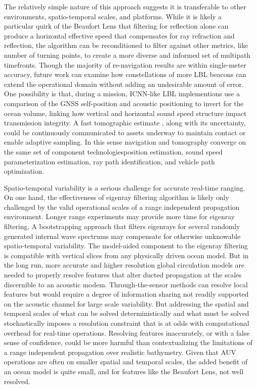 The relatively simple nature of this approach suggests it is transferable to other environments, spatio-temporal scales, and platforms.
While it is likely a particular quirk of the Beaufort Lens that filtering for reflection alone can produce a horizontal effective speed that compensates for ray refraction and reflection, the algorithm can be reconditioned to filter against other metrics, like number of turning points, to create a more diverse and informed set of multipath timefronts.
Though the majority of re-navigation results are within single-meter accuracy, future work can examine how constellations of more LBL beacons can extend the operational domain without adding an undesirable amount of error.
One possibility is that, during a mission, ICNN-like LBL implementions use a comparison of the GNSS self-position and acoustic positioning to invert for the ocean volume, linking how vertical and horizontal sound speed structure impact transmission integrity.
 A fast tomographic estimate \citep{deffenbaugh_optimal_1997,Elisseeff2002}, along with its uncertainty, could be continuously communicated to assets underway to maintain contact or enable adaptive sampling.
In this sense navigation and tomography converge on the same set of component technologies\textemdash position estimation, sound speed parameterization estimation, ray path identification, and vehicle path optimization.

Spatio-temporal variability is a serious challenge for accurate real-time ranging.
On one hand, the effectiveness of eigenray filtering algorithm is likely only challenged by the valid operational scales of a range independent propagation environment.
Longer range experiments may provide more time for eigenray filtering.
A bootstrapping approach that filters eigenrays for several randomly generated internal wave spectrums may compensate for otherwise unknowable spatio-temporal variability.
The model-aided component to the eigenray filtering is compatible with vertical slices from any physically driven ocean model.
But in the long run, more accurate and higher resolution global circulation models are needed to properly resolve features that alter ducted propagation at the scales discernible to an acoustic modem.
Through-the-sensor methods can resolve local features but would require a degree of information sharing not readily supported on the acoustic channel for large scale variability.
But addressing the spatial and temporal scales of what can be solved deterministically and what must be solved stochastically imposes a resolution constraint that is at odds with computational overhead for real-time operations.
Resolving features inaccurately, or with a false sense of confidence, could be more harmful than contextualizing the limitations of a range independent propagation over realistic bathymetry.
Given that AUV operations are often on smaller spatial and temporal scales, the added benefit of an ocean model is quite small, and for features like the Beaufort Lens, not well resolved.

